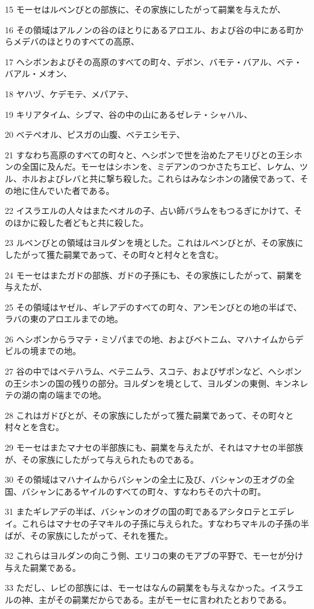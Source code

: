 \par 15 モーセはルベンびとの部族に、その家族にしたがって嗣業を与えたが、
\par 16 その領域はアルノンの谷のほとりにあるアロエル、および谷の中にある町からメデバのほとりのすべての高原、
\par 17 ヘシボンおよびその高原のすべての町々、デボン、バモテ・バアル、ベテ・バアル・メオン、
\par 18 ヤハヅ、ケデモテ、メパアテ、
\par 19 キリアタイム、シブマ、谷の中の山にあるゼレテ・シャハル、
\par 20 ベテペオル、ピスガの山腹、ベテエシモテ、
\par 21 すなわち高原のすべての町々と、ヘシボンで世を治めたアモリびとの王シホンの全国に及んだ。モーセはシホンを、ミデアンのつかさたちエビ、レケム、ツル、ホルおよびレバと共に撃ち殺した。これらはみなシホンの諸侯であって、その地に住んでいた者である。
\par 22 イスラエルの人々はまたベオルの子、占い師バラムをもつるぎにかけて、そのほかに殺した者どもと共に殺した。
\par 23 ルベンびとの領域はヨルダンを境とした。これはルベンびとが、その家族にしたがって獲た嗣業であって、その町々と村々とを含む。
\par 24 モーセはまたガドの部族、ガドの子孫にも、その家族にしたがって、嗣業を与えたが、
\par 25 その領域はヤゼル、ギレアデのすべての町々、アンモンびとの地の半ばで、ラバの東のアロエルまでの地。
\par 26 ヘシボンからラマテ・ミゾパまでの地、およびベトニム、マハナイムからデビルの境までの地。
\par 27 谷の中ではベテハラム、ベテニムラ、スコテ、およびザポンなど、ヘシボンの王シホンの国の残りの部分。ヨルダンを境として、ヨルダンの東側、キンネレテの湖の南の端までの地。
\par 28 これはガドびとが、その家族にしたがって獲た嗣業であって、その町々と村々とを含む。
\par 29 モーセはまたマナセの半部族にも、嗣業を与えたが、それはマナセの半部族が、その家族にしたがって与えられたものである。
\par 30 その領域はマハナイムからバシャンの全土に及び、バシャンの王オグの全国、バシャンにあるヤイルのすべての町々、すなわちその六十の町。
\par 31 またギレアデの半ば、バシャンのオグの国の町であるアシタロテとエデレイ。これらはマナセの子マキルの子孫に与えられた。すなわちマキルの子孫の半ばが、その家族にしたがって、それを獲た。
\par 32 これらはヨルダンの向こう側、エリコの東のモアブの平野で、モーセが分け与えた嗣業である。
\par 33 ただし、レビの部族には、モーセはなんの嗣業をも与えなかった。イスラエルの神、主がその嗣業だからである。主がモーセに言われたとおりである。

